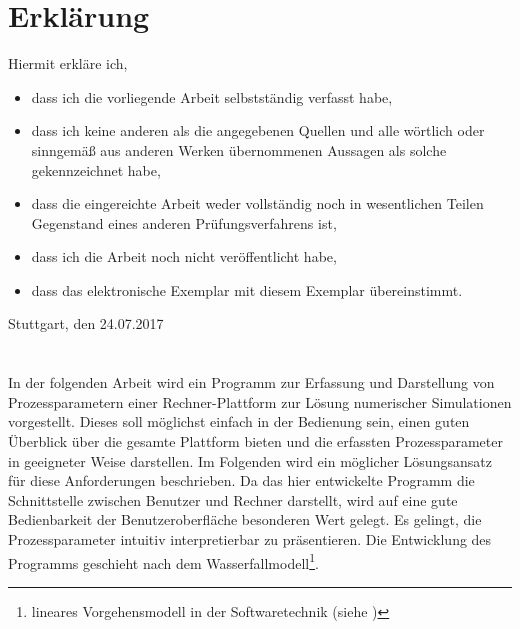 	\restoregeometry

	\thispagestyle{empty}
	\cleardoublepage

	\chapter*{Erklärung}
	Hiermit erkläre ich,

	\begin{itemize}
		\item dass ich die vorliegende Arbeit selbstständig verfasst habe,
		\item dass ich keine anderen als die angegebenen Quellen und alle wörtlich oder sinngemäß aus anderen Werken übernommenen Aussagen als solche gekennzeichnet habe,
		\item dass die eingereichte Arbeit weder vollständig noch in wesentlichen Teilen Gegenstand eines anderen Prüfungsverfahrens ist,
		\item dass ich die Arbeit noch nicht veröffentlicht habe,
		\item dass das elektronische Exemplar mit diesem Exemplar übereinstimmt.
	\end{itemize}

	\bigskip

	Stuttgart, den 24.07.2017

	\newpage
	
	

	\chapter*{\abstractname}
	In der folgenden Arbeit wird ein Programm zur Erfassung und Darstellung von Prozessparametern einer Rechner-Plattform zur Lösung numerischer Simulationen vorgestellt. Dieses soll möglichst einfach in der Bedienung sein, einen guten Überblick über die gesamte Plattform bieten und die erfassten Prozessparameter in geeigneter Weise darstellen.\parag{}
	Im Folgenden wird ein möglicher Lösungsansatz für diese Anforderungen beschrieben. Da das hier entwickelte Programm die Schnittstelle zwischen Benutzer und Rechner darstellt, wird auf eine gute Bedienbarkeit der Benutzeroberfläche besonderen Wert gelegt. Es gelingt, die Prozessparameter intuitiv interpretierbar zu präsentieren. Die Entwicklung des Programms geschieht nach dem Wasserfallmodell\footnote{lineares Vorgehensmodell in der Softwaretechnik (siehe )}.


